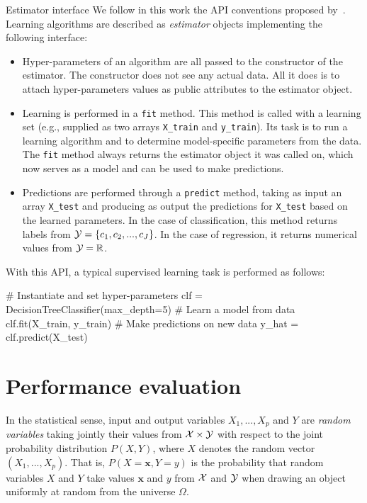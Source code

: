 \begin{remark}{Estimator interface}
We follow in this work the API conventions proposed by~\citet{buitinck:2013}.
Learning algorithms are described as \textit{estimator} objects implementing the
following interface:

\begin{itemize}
\item Hyper-parameters of an algorithm are all passed to the constructor of the
estimator. The constructor does not see any actual data. All it does
is to attach hyper-parameters values as public attributes to the estimator object.
\item Learning is performed in a \texttt{fit} method. This method is called with
a learning set (e.g., supplied as two arrays \texttt{X\_train} and \texttt{y\_train}). Its
task is to run a learning algorithm and to determine model-specific parameters
from the data. The \texttt{fit} method always returns the estimator object
it was called on, which now serves as a model and can be used to make predictions.
\item Predictions are performed through a \texttt{predict} method, taking
as input an array \texttt{X\_test} and producing as output the predictions for
\texttt{X\_test} based on the learned parameters. In the case of classification,
this method returns labels from ${\cal Y} = \{c_1, c_2, ..., c_J\}$. In the case of regression,
it returns numerical values from ${\cal Y} = \mathbb{R}$.
\end{itemize}

With this API, a typical supervised learning task is performed as follows:

\vskip0.3cm
\begin{pythoncode}
# Instantiate and set hyper-parameters
clf = DecisionTreeClassifier(max_depth=5)
# Learn a model from data
clf.fit(X_train, y_train)
# Make predictions on new data
y_hat = clf.predict(X_test)
\end{pythoncode}
\end{remark}


\section{Performance evaluation}
\label{sec:2:performance-evaluation}

In the statistical sense, input and output variables $X_1, ..., X_p$ and $Y$
are \textit{random variables} taking jointly their values from ${\cal X} \times
{\cal Y}$ with respect to the joint probability distribution $P(X, Y)$, where
$X$ denotes the random vector $(X_1, ..., X_p)$. That is, $P(X=\mathbf{x},
Y=y)$ is the probability that random variables $X$ and $Y$ take values
$\mathbf{x}$ and $y$ from ${\cal X}$ and ${\cal Y}$ when drawing an object
uniformly at random from the universe $\Omega$.

